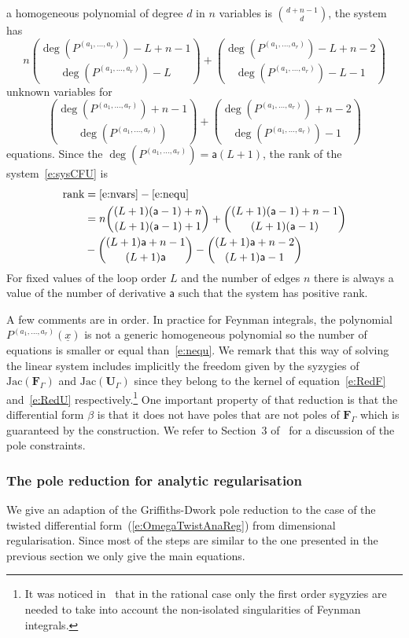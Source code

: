 \documentclass[a4paper,12pt]{article}
\numberwithin{equation}{section}
\numberwithin{figure}{section}
\begin{document}
a homogeneous polynomial of degree $d$ in $n$ variables is
$\binom{d+n-1}{d}$,  the system has
\begin{equation}\label{e:nvars}
n \binom{\deg( P^{(a_1,\dots,a_r)})-L+n-1}{\deg( P^{(a_1,\dots,a_r)})-L}+\binom{\deg( P^{(a_1,\dots,a_r)})-L+n-2}{\deg( P^{(a_1,\dots,a_r)})-L-1}
\end{equation} unknown variables for
\begin{equation}\label{e:nequ}
\binom{\deg( P^{(a_1,\dots,a_r)})+n-1}{\deg( P^{(a_1,\dots,a_r)})}+\binom{\deg( P^{(a_1,\dots,a_r)})+n-2}{\deg( P^{(a_1,\dots,a_r)})-1}
\end{equation}
equations.
%
%
Since the $\deg(P^{(a_1,\dots,a_r)})=\mathsf{a}(L+1)$, the rank of the system~\eqref{e:sysCFU} is
  \begin{align}
    \label{e:Rank}
    \textrm{rank}&=\eqref{e:nvars}-\eqref{e:nequ}\\
\nonumber    &=n \binom{(L+1)(\mathsf{a}-1)+n
               }{(L+1) (\mathsf{a}-1)+1}+\binom{(L+1)(\mathsf{a}-1)+n-1}{(L+1) (\mathsf{a}-1)}\cr
             \nonumber    &
                              -\binom{(L+1) \mathsf{a}+n-1}{(L+1) \mathsf{a}}-\binom{(L+1) \mathsf{a}+n-2}{(L+1) \mathsf{a}-1}
  \end{align}
For fixed values of the loop order $L$
and the number of edges $n$ there is always a value of the
number of derivative $\mathsf{a}$ such that the system has
positive rank.

A few comments are in order. In practice for Feynman integrals,   the polynomial $ P^{(a_1,\dots,a_r)}(\underline x)$ is not a generic
homogeneous polynomial so the number of equations is smaller or equal than~\eqref{e:nequ}.
%
We remark that this way of solving the linear system includes implicitly the
freedom given by the syzygies of $\textrm{Jac}(\textbf{F}_\Gamma)$ and
$\textrm{Jac}(\textbf{U}_\Gamma)$ since they belong to
the kernel of equation~\eqref{e:RedF} and~\eqref{e:RedU}
respectively.\footnote{It was noticed in~\cite{Lairez:2022zkj} that in
  the rational case only the first order sygyzies are needed to take
  into account the non-isolated singularities of Feynman integrals.}
%
%
%
One important property of that reduction is that the differential form $\beta$ is that it
does not have poles that are not poles of $\textbf{F}_\Gamma$ which is
guaranteed by the construction. We refer
to Section~3 of~\cite{Lairez:2022zkj} for a discussion of the pole constraints.
%
%
  \subsubsection{The pole reduction for analytic
    regularisation}\label{sec:PoleRedAn}
We give an adaption of the Griffiths-Dwork pole reduction to the case
of the twisted differential form~(\ref{e:OmegaTwistAnaReg})  from
dimensional regularisation. Since most of the steps are similar to the
one presented in the previous section we only give the main equations.
\end{document}
